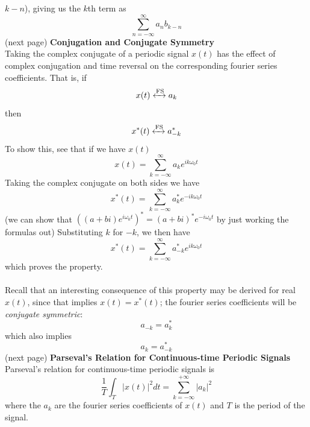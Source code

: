 \documentclass{report}
\begin{document}
$k-n$), giving us the $k$th term as
\begin{equation*}
\sum^\infty_{n=-\infty}a_nb_{k-n}
\end{equation*}
(next page)\newpage
\noindent\textbf{Conjugation and Conjugate Symmetry}\\
Taking the complex conjugate of a periodic signal $x(t)$ has the effect of complex conjugation and time reversal on the corresponding fourier series coefficients. That is, if
\begin{equation*}
x(t)\xleftrightarrow[]{\text{FS}}a_k
\end{equation*}
then
\begin{equation*}
x^*(t)\xleftrightarrow[]{\text{FS}}a^*_{-k}
\end{equation*}
To show this, see that if we have $x(t)$
\begin{equation*}
x(t)=\sum^\infty_{k=-\infty}a_ke^{ik\omega_0t}
\end{equation*}
Taking the complex conjugate on both sides we have
\begin{equation*}
x^*(t)=\sum^\infty_{k=-\infty}a^*_ke^{-ik\omega_0t}
\end{equation*}
(we can show that $\left((a+bi)e^{i\omega_0t}\right)^*=(a+bi)^*e^{-i\omega_0t}$ by just working the formulas out) Substituting $k$ for $-k$, we then have
\begin{equation*}
x^*(t)=\sum^\infty_{k=-\infty}a^*_{-k}e^{ik\omega_0t}
\end{equation*}
which proves the property.\\
\vspace{1mm}\\
Recall that an interesting consequence of this property may be derived for real $x(t)$, since that implies $x(t)=x^*(t)$; the fourier series coefficients will be \textit{conjugate symmetric}:
\begin{equation*}
a_{-k}=a^*_k
\end{equation*}
which also implies
\begin{equation*}
a_{k}=a^*_{-k}
\end{equation*}
(next page)\newpage
\noindent\textbf{Parseval's Relation for Continuous-time Periodic Signals}\\
Parseval's relation for continuous-time periodic signals is
\begin{equation*}
\frac{1}{T}\int_T|x(t)|^2dt=\sum^{+\infty}_{k=-\infty}|a_k|^2
\end{equation*}
where the $a_k$ are the fourier series coefficients of $x(t)$ and $T$ is the period of the signal.\\
\end{document}
